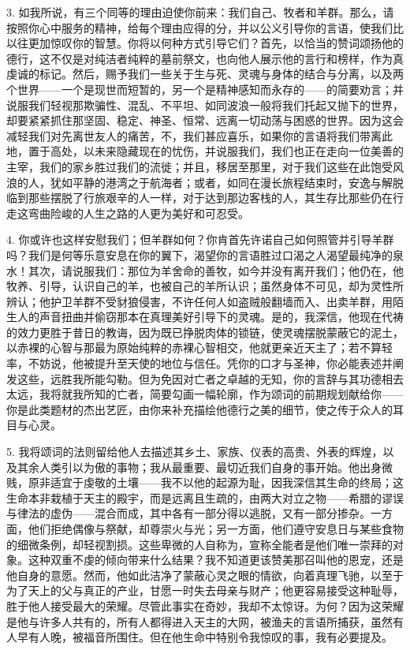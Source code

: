 3. 如我所说，有三个同等的理由迫使你前来：我们自己、牧者和羊群。那么，请按照你心中服务的精神，给每个理由应得的分，并以公义引导你的言语，使我们比以往更加惊叹你的智慧。你将以何种方式引导它们？首先，以恰当的赞词颂扬他的德行，这不仅是对纯洁者纯粹的墓前祭文，也向他人展示他的言行和榜样，作为真虔诚的标记。然后，赐予我们一些关于生与死、灵魂与身体的结合与分离，以及两个世界——一个是现世而短暂的，另一个是精神感知而永存的——的简要劝言；并说服我们轻视那欺骗性、混乱、不平坦、如同波浪一般将我们托起又抛下的世界，却要紧紧抓住那坚固、稳定、神圣、恒常、远离一切动荡与困惑的世界。因为这会减轻我们对先离世友人的痛苦，不，我们甚应喜乐，如果你的言语将我们带离此地，置于高处，以未来隐藏现在的忧伤，并说服我们，我们也正在走向一位美善的主宰，我们的家乡胜过我们的流徙；并且，移居至那里，对于我们这些在此饱受风浪的人，犹如平静的港湾之于航海者；或者，如同在漫长旅程结束时，安逸与解脱临到那些摆脱了行旅艰辛的人一样，对于达到那边客栈的人，其生存比那些仍在行走这弯曲险峻的人生之路的人更为美好和可忍受。\par

4. 你或许也这样安慰我们；但羊群如何？你肯首先许诺自己如何照管并引导羊群吗？我们是何等乐意安息在你的翼下，渴望你的言语胜过口渴之人渴望最纯净的泉水！其次，请说服我们：那位为羊舍命的善牧，如今并没有离开我们；他仍在，他牧养、引导，认识自己的羊，也被自己的羊所认识；虽然身体不可见，却为灵性所辨认；他护卫羊群不受豺狼侵害，不许任何人如盗贼般翻墙而入、出卖羊群，用陌生人的声音扭曲并偷窃那本在真理美好引导下的灵魂。是的，我深信，他现在代祷的效力更胜于昔日的教诲，因为既已挣脱肉体的锁链，使灵魂摆脱蒙蔽它的泥土，以赤裸的心智与那最为原始纯粹的赤裸心智相交，他就更亲近天主了；若不算轻率，不妨说，他被提升至天使的地位与信任。凭你的口才与圣神，你必能表述并阐发这些，远胜我所能勾勒。但为免因对亡者之卓越的无知，你的言辞与其功德相去太远，我将就我所知的亡者，简要勾画一幅轮廓，作为颂词的前期规划献给你——你是此类题材的杰出艺匠，由你来补充描绘他德行之美的细节，使之传于众人的耳目与心灵。\par

5. 我将颂词的法则留给他人去描述其乡土、家族、仪表的高贵、外表的辉煌，以及其余人类引以为傲的事物；我从最重要、最切近我们自身的事开始。他出身微贱，原非适宜于虔敬的土壤——我不以他的起源为耻，因我深信其生命的终局；这生命本非栽植于天主的殿宇，而是远离且生疏的，由两大对立之物——希腊的谬误与律法的虚伪——混合而成，其中各有一部分得以逃脱，又有一部分掺杂。一方面，他们拒绝偶像与祭献，却尊崇火与光；另一方面，他们遵守安息日与某些食物的细微条例，却轻视割损。这些卑微的人自称为，宣称全能者是他们唯一崇拜的对象。这种双重不虔的倾向带来什么结果？我不知道更该赞美那召叫他的恩宠，还是他自身的意愿。然而，他如此洁净了蒙蔽心灵之眼的情欲，向着真理飞驰，以至于为了天上的父与真正的产业，甘愿一时失去母亲与财产；他更容易接受这种耻辱，胜于他人接受最大的荣耀。尽管此事实在奇妙，我却不太惊讶。为何？因为这荣耀是他与许多人共有的，所有人都得进入天主的大网，被渔夫的言语所捕获，虽然有人早有人晚，被福音所围住。但在他生命中特别令我惊叹的事，我有必要提及。\par

